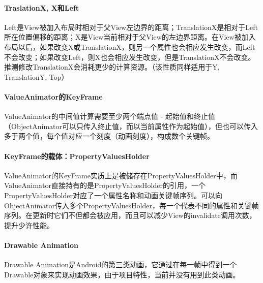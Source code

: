\documentclass[UTF8]{ctexart}
\begin{document}
    \paragraph{TraslationX, X和Left}
    Left是View被加入布局时相对于父View左边界的距离；TranslationX是相对于Left所在位置偏移的距离；X是View当前相对于父View的左边界距离。在View被加入布局以后，如果改变X或TranslationX，则另一个属性也会相应发生改变，而Left不会改变；如果改变Left，则X也会相应发生改变，但是TranslationX不会改变。推测修改TranslationX会消耗更少的计算资源。（该性质同样适用于Y, TranslationY, Top）
    \paragraph{ValueAnimator的KeyFrame}
    ValueAnimator的中间值计算需要至少两个端点值 - 起始值和终止值（ObjectAnimator可以只传入终止值，而以当前属性作为起始值），但也可以传入多于两个值，每个值对应一个刻度（动画刻度），构成数个关键帧。
    \paragraph{KeyFrame的载体：PropertyValuesHolder}
    ValueAnimator的KeyFrame实质上是被储存在PropertyValuesHolder中，而ValueAnimator直接持有的是PropertyValuesHolder的引用，一个PropertyValuesHolder对应了一个属性名称和动画关键帧序列。可以向ObjectAnimator传入多个PropertyValuesHolder，每一个代表不同的属性和关键帧序列。在更新时它们不但都会被应用，而且可以减少View的invalidate调用次数，提升少许性能。
    \paragraph{Drawable Animation}
    Drawable Animation是Android的第三类动画，它通过在每一帧中得到一个Drawable对象来实现动画效果，由于项目特性，当前并没有用到此类动画。
\end{document}
